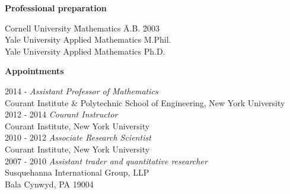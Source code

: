 \documentclass[12pt]{article}
\begin{document}
\noindent
{\bf Professional preparation}
\begin{tabbing}
Cornell University \qquad \= Mathematics \qquad \qquad \qquad \= A.B. 
    \qquad \=2003\\
Yale University \> Applied Mathematics \> M.Phil.  \\
Yale University \> Applied Mathematics \> Ph.D.  \\
\end{tabbing}



\noindent
{\bf Appointments}
\begin{tabbing}
2014 - \qquad \qquad \= {\em Assistant Professor of Mathematics} \\
\> Courant Institute \& Polytechnic School of Engineering, New York
University\\
 2012 - 2014 \> {\em Courant Instructor}\\
  \>Courant Institute, New York University \\
2010 - 2012 \> {\em Associate Research Scientist} \\
       \> Courant Institute, New York University\\
2007 - 2010 \> {\em Assistant trader and quantitative
            researcher}\\
    \> Susquehanna International Group, LLP \\
    \> Bala Cynwyd, PA 19004\\
\end{tabbing}
\end{document}
